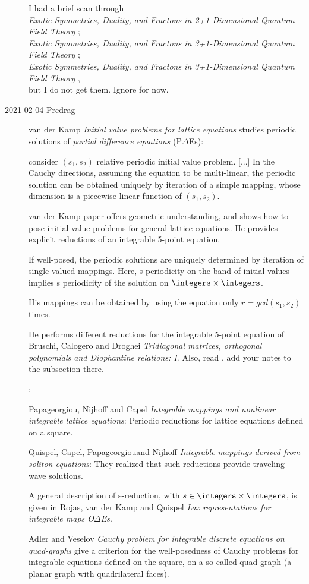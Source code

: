 \begin{description}
I had a brief scan through\\
{\em Exotic Symmetries, Duality, and Fractons in 2+1-Dimensional
Quantum Field Theory} ;\\
{\em Exotic  Symmetries, Duality, and Fractons in 3+1-Dimensional
Quantum Field Theory} ;\\
{\em Exotic  Symmetries, Duality, and Fractons in 3+1-Dimensional
Quantum Field Theory} ,\\
but I do not get them. Ignore for now.

    \item[2021-02-04 Predrag]

van der Kamp
{\em Initial value problems for lattice equations}              \toCB
studies periodic solutions of
\emph{partial difference equations} (P$\Delta$Es):

consider $(s_1, s_2)$ relative periodic initial value problem.
[...]
In the Cauchy directions, assuming the equation to be multi-linear, the
periodic solution can be obtained uniquely by iteration of a
simple mapping, whose dimension is a piecewise linear function of $(s_1,
s_2)$.

van der Kamp paper offers geometric understanding, and
shows how to pose initial value problems for general lattice equations.
He provides explicit reductions of an integrable 5-point equation.

If well-posed, the periodic solutions are uniquely determined by
iteration of single-valued mappings. Here, s-periodicity on the band of
initial values implies s periodicity of the solution on
$\integers\times\integers$.

His mappings can be obtained by
using the equation only $r = gcd(s_1, s_2)$ times.

He performs different reductions for the integrable 5-point equation of
Bruschi, Calogero and Droghei {\em Tridiagonal matrices,
orthogonal polynomials and {Diophantine} relations: {I}}. Also,
read , add your notes to the subsection there.


:

Papageorgiou, Nijhoff and Capel
{\em Integrable mappings and nonlinear integrable lattice equations}:
Periodic reductions for lattice equations defined on a square.

Quispel, Capel, Papageorgiouand Nijhoff {\em Integrable
mappings derived from soliton equations}: They realized that such
reductions provide traveling wave solutions.

A general description of s-reduction, with
$s\in\integers\times\integers$, is given in
Rojas, van der Kamp and Quispel
{\em Lax representations for integrable maps {O$\Delta$Es}}.

Adler and Veselov
{\em Cauchy problem for integrable discrete equations on quad-graphs}
give a criterion for the well-posedness of Cauchy problems for integrable
equations defined on the square, on a so-called quad-graph (a planar
graph with quadrilateral faces).

\end{description}

